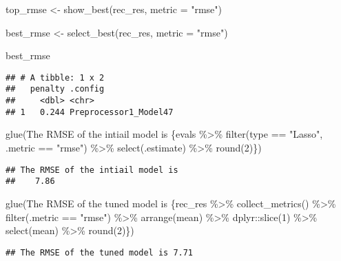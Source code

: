 \documentclass[
]{book}
\newenvironment{Shaded}{\begin{snugshade}}{\end{snugshade}}
\newcommand{\AttributeTok}[1]{\textcolor[rgb]{0.77,0.63,0.00}{#1}}
\newcommand{\FunctionTok}[1]{\textcolor[rgb]{0.00,0.00,0.00}{#1}}
\newcommand{\NormalTok}[1]{#1}
\newcommand{\OtherTok}[1]{\textcolor[rgb]{0.56,0.35,0.01}{#1}}
\newcommand{\StringTok}[1]{\textcolor[rgb]{0.31,0.60,0.02}{#1}}
\begin{document}
\begin{Shaded}
\begin{Highlighting}[]
\NormalTok{top\_rmse }\OtherTok{\textless{}{-}} \FunctionTok{show\_best}\NormalTok{(rec\_res, }\AttributeTok{metric =} \StringTok{"rmse"}\NormalTok{)}

\NormalTok{best\_rmse }\OtherTok{\textless{}{-}} \FunctionTok{select\_best}\NormalTok{(rec\_res, }\AttributeTok{metric =} \StringTok{"rmse"}\NormalTok{)}

\NormalTok{best\_rmse }
\end{Highlighting}
\end{Shaded}

\begin{verbatim}
## # A tibble: 1 x 2
##   penalty .config              
##     <dbl> <chr>                
## 1   0.244 Preprocessor1_Model47
\end{verbatim}

\begin{Shaded}
\begin{Highlighting}[]
\FunctionTok{glue}\NormalTok{(}\StringTok{\textquotesingle{}The RMSE of the intiail model is }
\StringTok{     \{evals \%\textgreater{}\%}
\StringTok{  filter(type == "Lasso", .metric == "rmse") \%\textgreater{}\%}
\StringTok{  select(.estimate) \%\textgreater{}\%}
\StringTok{  round(2)\}\textquotesingle{}}\NormalTok{)}
\end{Highlighting}
\end{Shaded}

\begin{verbatim}
## The RMSE of the intiail model is 
##    7.86
\end{verbatim}

\begin{Shaded}
\begin{Highlighting}[]
\FunctionTok{glue}\NormalTok{(}\StringTok{\textquotesingle{}The RMSE of the tuned model is \{rec\_res \%\textgreater{}\%}
\StringTok{  collect\_metrics() \%\textgreater{}\%}
\StringTok{  filter(.metric == "rmse") \%\textgreater{}\%}
\StringTok{  arrange(mean) \%\textgreater{}\%}
\StringTok{  dplyr::slice(1) \%\textgreater{}\%}
\StringTok{  select(mean) \%\textgreater{}\%}
\StringTok{  round(2)\}\textquotesingle{}}\NormalTok{)}
\end{Highlighting}
\end{Shaded}

\begin{verbatim}
## The RMSE of the tuned model is 7.71
\end{verbatim}
\end{document}
